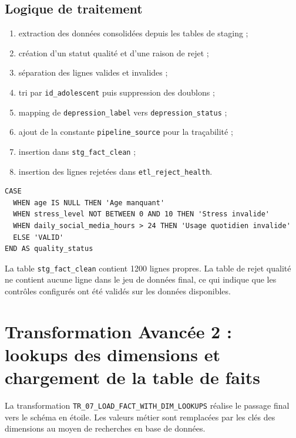 \documentclass[11pt,a4paper]{report}
\begin{document}
\subsection{Logique de traitement}

\begin{enumerate}[label=\textbf{\arabic*.},leftmargin=1.2cm]
  \item extraction des données consolidées depuis les tables de staging ;
  \item création d'un statut qualité et d'une raison de rejet ;
  \item séparation des lignes valides et invalides ;
  \item tri par \texttt{id\_adolescent} puis suppression des doublons ;
  \item mapping de \texttt{depression\_label} vers \texttt{depression\_status} ;
  \item ajout de la constante \texttt{pipeline\_source} pour la traçabilité ;
  \item insertion dans \texttt{stg\_fact\_clean} ;
  \item insertion des lignes rejetées dans \texttt{etl\_reject\_health}.
\end{enumerate}

\begin{codebox}
\begin{lstlisting}[style=sqlstyle]
CASE
  WHEN age IS NULL THEN 'Age manquant'
  WHEN stress_level NOT BETWEEN 0 AND 10 THEN 'Stress invalide'
  WHEN daily_social_media_hours > 24 THEN 'Usage quotidien invalide'
  ELSE 'VALID'
END AS quality_status
\end{lstlisting}
\end{codebox}

\begin{resultbox}
La table \texttt{stg\_fact\_clean} contient 1200 lignes propres. La table de rejet qualité ne contient aucune ligne dans le jeu de données final, ce qui indique que les contrôles configurés ont été validés sur les données disponibles.
\end{resultbox}

\section{Transformation Avancée 2 : lookups des dimensions et chargement de la table de faits}

La transformation \texttt{TR\_07\_LOAD\_FACT\_WITH\_DIM\_LOOKUPS} réalise le passage final vers le schéma en étoile. Les valeurs métier sont remplacées par les clés des dimensions au moyen de recherches en base de données.
\end{document}
